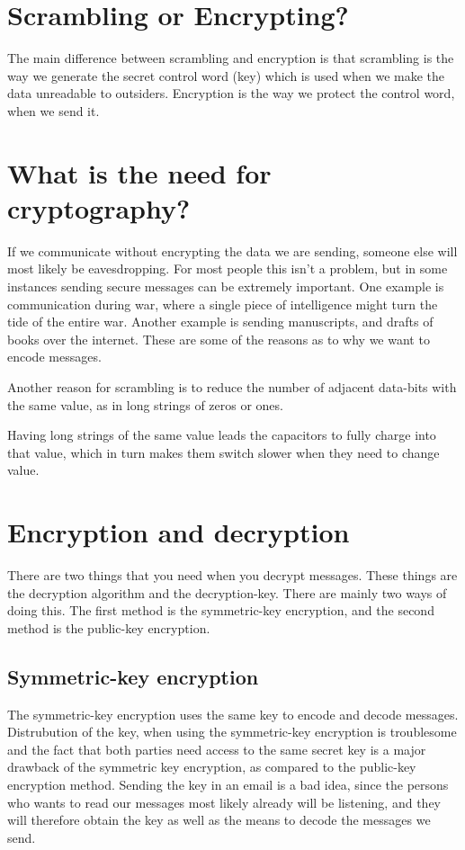 \section{Scrambling or Encrypting?}
The main difference between scrambling and encryption is that scrambling is the
way we generate the secret control word (key) which is used when we make the
data unreadable to outsiders. Encryption is the way we protect the control word, 
when we send it.

\section{What is the need for cryptography?}
If we communicate without encrypting the data we are sending, someone 
else will most likely be eavesdropping. For most people this isn’t a problem, 
but in some instances sending secure messages can be extremely important. One 
example is communication during war, where a single piece of intelligence might 
turn the tide of the entire war. Another example is sending manuscripts, and 
drafts of books over the internet. These are some of the reasons as to why we 
want to encode messages.

Another reason for scrambling is to reduce the number of adjacent data-bits with 
the same value, as in long strings of zeros or ones. 

Having long strings of the same value leads the capacitors to fully charge into 
that value, which in turn makes them switch slower when they need to change 
value. 

\section{Encryption and decryption}
There are two things that you need when you decrypt messages. These things 
are the decryption algorithm and the decryption-key. There are mainly two ways 
of doing this. The first method is the symmetric-key encryption, and the second 
method is the public-key encryption.

\subsection{Symmetric-key encryption}
The symmetric-key encryption uses the same key to encode and decode messages. 
Distrubution of the key, when using the symmetric-key encryption is troublesome 
and the fact that both parties need access to the same secret key is a major 
drawback of the symmetric key encryption, as compared to the public-key 
encryption method. Sending the key in an email is a bad idea, since the persons 
who wants to read our messages  most likely already will be listening, and they 
will therefore obtain the key as well as the means to decode the messages we 
send.

